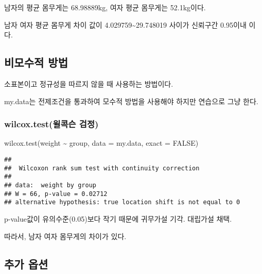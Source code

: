 \documentclass[
]{article}
\newenvironment{Shaded}{\begin{snugshade}}{\end{snugshade}}
\newcommand{\AttributeTok}[1]{\textcolor[rgb]{0.77,0.63,0.00}{#1}}
\newcommand{\ConstantTok}[1]{\textcolor[rgb]{0.00,0.00,0.00}{#1}}
\newcommand{\FunctionTok}[1]{\textcolor[rgb]{0.00,0.00,0.00}{#1}}
\newcommand{\NormalTok}[1]{#1}
\newcommand{\SpecialCharTok}[1]{\textcolor[rgb]{0.00,0.00,0.00}{#1}}
\begin{document}
남자의 평균 몸무게는 68.98889kg, 여자 평균 몸무게는 52.1kg이다.

남자 여자 평균 몸무게 차이 값이 4.029759\textasciitilde29.748019 사이가 신뢰구간 0.95이내 이다.

\hypertarget{uxbe44uxbaa8uxc218uxc801-uxbc29uxbc95-2}{%
\subsection{비모수적 방법}\label{uxbe44uxbaa8uxc218uxc801-uxbc29uxbc95-2}}

소표본이고 정규성을 따르지 않을 때 사용하는 방법이다.

my.data는 전제조건을 통과하여 모수적 방법을 사용해야 하지만 연습으로 그냥 한다.

\hypertarget{wilcox.testuxc70cuxcf55uxc2a8-uxac80uxc815-1}{%
\subsubsection{wilcox.test(윌콕슨 검정)}\label{wilcox.testuxc70cuxcf55uxc2a8-uxac80uxc815-1}}

\begin{Shaded}
\begin{Highlighting}[]
\FunctionTok{wilcox.test}\NormalTok{(weight }\SpecialCharTok{\textasciitilde{}}\NormalTok{ group, }\AttributeTok{data =}\NormalTok{ my.data, }\AttributeTok{exact =} \ConstantTok{FALSE}\NormalTok{)}
\end{Highlighting}
\end{Shaded}

\begin{verbatim}
## 
##  Wilcoxon rank sum test with continuity correction
## 
## data:  weight by group
## W = 66, p-value = 0.02712
## alternative hypothesis: true location shift is not equal to 0
\end{verbatim}

p-value값이 유의수준(0.05)보다 작기 때문에 귀무가설 기각. 대립가설 채택.

따라서, 남자 여자 몸무게의 차이가 있다.

\hypertarget{uxcd94uxac00-uxc635uxc158-1}{%
\subsection{추가 옵션}\label{uxcd94uxac00-uxc635uxc158-1}}

\begin{Shaded}
\end{Shaded}
\end{document}
